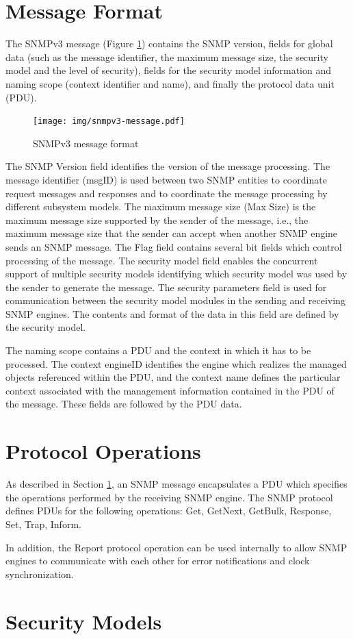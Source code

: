 \section{Message Format}\label{sec:messformat}
The SNMPv3 message (Figure \ref{fig:snmp-format}) contains the SNMP version, fields for global data (such as the message identifier, the maximum message size, the security model and the level of security), fields for the security model information and naming scope (context identifier and name), and finally the protocol data unit (PDU).
\begin{figure}[htp]	
\begin{center}
    \texttt{[image: img/snmpv3-message.pdf]}
    \caption{SNMPv3 message format}   
	\label{fig:snmp-format}
\end{center}
\end{figure}

The SNMP Version field identifies the version of the message processing. The message identifier (msgID) is used between two SNMP entities to coordinate request messages and responses and to coordinate the message processing by different subsystem models. The maximum message size (Max Size) is the maximum message size supported by the sender of the message, i.e., the maximum message size that the sender can accept when another SNMP engine sends an SNMP message. The Flag field contains several bit fields which control processing of the message. The security model field enables the concurrent support of multiple security models identifying which security model was used by the sender to generate the message. The security parameters field is used for communication between the security model modules in the sending and receiving SNMP engines. The contents and format of the data in this field are defined by the security model.

The naming scope contains a PDU and the context in which it has to be processed. The context engineID identifies the engine which realizes the managed objects referenced within the PDU, and the context name defines the particular context associated with the management information contained in the PDU of the message. These fields are followed by the PDU data.

\section{Protocol Operations}
As described in Section \ref{sec:messformat}, an SNMP message encapsulates a PDU which specifies the operations performed by the receiving SNMP engine. The SNMP protocol defines PDUs for the following operations: Get, GetNext, GetBulk, Response, Set, Trap, Inform.

In addition, the Report protocol operation can be used internally to allow SNMP engines to communicate with each other for error notifications and clock synchronization.



\section{Security Models}

